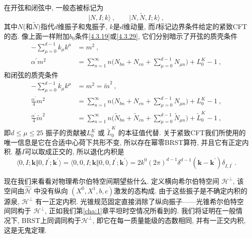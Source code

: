 在开弦和闭弦中, 一般态被标记为
\begin{equation}
|N, I ; k\rangle\:, \qquad|N, \tilde{N}, I ; k\rangle \:, \label{4.4.2}
\end{equation}
其中$N$(和$\tilde{N})$指代$d$维振子和鬼振子, $k$是$d$维动量, 而$I$标记边界条件给定的紧致CFT的态. 像上面一样附加$b_{0}$条件\eqref{4.3.19}或\eqref{4.3.29}, 它们分别暗示了开弦的质壳条件
\begin{subequations} \label{4.4.3}
\begin{align}
-\sum_{\mu=0}^{d-1} k_{\mu} k^{\mu}&=m^{2}  \:, \label{4.4.3a} \\
\alpha^{\prime} m^{2}&=\sum_{n=1}^{\infty} n\Biggl(N_{b n}+N_{c n}+\sum_{\mu=0}^{d-1} N_{\mu n}\Biggr)+L_{0}^{K}-1 \:, \label{4.4.3b}
\end{align}
\end{subequations}
和闭弦的质壳条件
\begin{subequations} \label{4.4.4}
\begin{align}
-\sum_{\mu=0}^{d-1} k_{\mu} k^{\mu}&=m^{2}=\tilde{m}^{2} \:, \label{4.4.4a}\\
\frac{\alpha^{\prime}}{4} m^{2}&=\sum_{n=1}^{\infty} n\Biggl(N_{b n}+N_{c n}+\sum_{\mu=0}^{d-1} N_{\mu n}\Biggr)+L_{0}^{K}-1 \:, \label{4.4.4b} \\
\frac{\alpha^{\prime}}{4} \tilde{m}^{2}&=\sum_{n=1}^{\infty} n\Biggl(\tilde{N}_{b n}+\tilde{N}_{c n}+\sum_{\mu=0}^{d-1} \tilde{N}_{\mu n}\Biggr)+\tilde{L}_{0}^{K}-1 \:, \label{4.4.4c}
\end{align}
\end{subequations}
即$d \leq \mu \leq 25$ 振子的贡献被$L_{0}^{K}$ 或 $\tilde{L}_{0}^{K}$ 的本征值代替. 关于紧致CFT我们所使用的唯一信息是它在合适中心荷下共形不变, 所以存在幂零BRST算符, 并且它有正定内积. 基$I$可以取成正交的, 所以退化内积是
\begin{equation}
\langle 0, I ; \mathbf{k} \Vert 0, I^{\prime} ; \mathbf{k}^{\prime}\rangle= \langle 0,0, I ; \mathbf{k} \Vert 0,0, I^{\prime} ; \mathbf{k}^{\prime}\rangle=2 k^{0}(2 \pi)^{d-1} \delta^{d-1} (\mathbf{k}-\mathbf{k}^{\prime}) \delta_{I, I^{\prime}} \:. \label{4.4.5}
\end{equation}

现在我们来看看对物理希尔伯特空间期望些什么. 定义横向希尔伯特空间 $\mathscr{H}^{\perp}$, 该空间由$\hat{\mathscr{H}}$ 中没有纵向 $\left(X^{0}, X^{1}, b,c\right)$激发的态构成. 由于这些振子是不确定内积的源泉, $\mathscr{H}^{\perp}$ 有一正定内积. 光锥规范固定直接消除了纵向振子——光锥希尔伯特空间同构于 $\mathscr{H}^{\perp}$, 正如我们第\ref{cha:1}章平坦时空情况所看到的. 我们将证明在一般情况下, BRST上同调同构于$\mathscr{H}^{\perp} $, 即它在每一质量能级的态数相同, 并有一正交内积, 这是无鬼定理.

